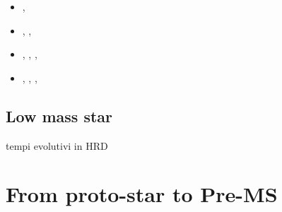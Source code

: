 \begin{itemize}
    \item {}, \xdiminuisce{\tau}
    \item {}, , 
    \item {}, , , \xaumenta{\tau}
    \item {}, , , \xdiminuisce{\tau}
\end{itemize}

\subsection{Low mass star}

tempi evolutivi in HRD


\section{From proto-star to Pre-MS}

